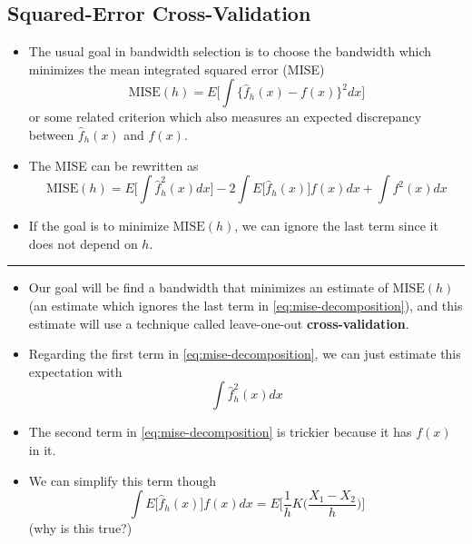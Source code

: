 \documentclass[]{book}
\begin{document}
\hypertarget{squared-error-cross-validation}{%
\subsection{Squared-Error Cross-Validation}\label{squared-error-cross-validation}}

\begin{itemize}
\item
  The usual goal in bandwidth selection is to choose the bandwidth
  which minimizes the mean integrated squared error (MISE)
  \begin{equation}
  \textrm{MISE}(h) = E\Big[ \int \{ \hat{f}_{h}(x) - f(x)   \}^{2} dx \Big]
  \end{equation}
  or some related criterion which also measures an expected discrepancy between \(\hat{f}_{h}(x)\) and \(f(x)\).
\item
  The MISE can be rewritten as
  \begin{equation}
  \textrm{MISE}(h) = E\Big[ \int \hat{f}_{h}^{2}(x) dx \Big]  - 2 \int E\Big[ \hat{f}_{h}(x) \Big] f(x) dx + \int f^{2}(x) dx
  \label{eq:mise-decomposition}
  \end{equation}
\item
  If the goal is to minimize \(\textrm{MISE}(h)\), we can ignore the last term since it does not depend on \(h\).
\end{itemize}

\begin{center}\rule{0.5\linewidth}{\linethickness}\end{center}

\begin{itemize}
\item
  Our goal will be find a bandwidth that minimizes an estimate of \(\textrm{MISE}(h)\) (an estimate which ignores the last term in \eqref{eq:mise-decomposition}),
  and this estimate will use a technique called leave-one-out \textbf{cross-validation}.
\item
  Regarding the first term in \eqref{eq:mise-decomposition}, we can just estimate this expectation with
  \begin{equation}
  \int \hat{f}_{h}^{2}(x) dx  \nonumber 
  \end{equation}
\item
  The second term in \eqref{eq:mise-decomposition} is trickier because it has \(f(x)\) in it.
\item
  We can simplify this term though
  \begin{equation}
  \int E\Big[ \hat{f}_{h}(x) \Big] f(x) dx = E\Bigg[ \frac{1}{h} K\Big( \frac{X_{1} - X_{2}}{h} \Big)  \Bigg] \nonumber 
  \end{equation}
  (why is this true?)
\end{itemize}
\end{document}

